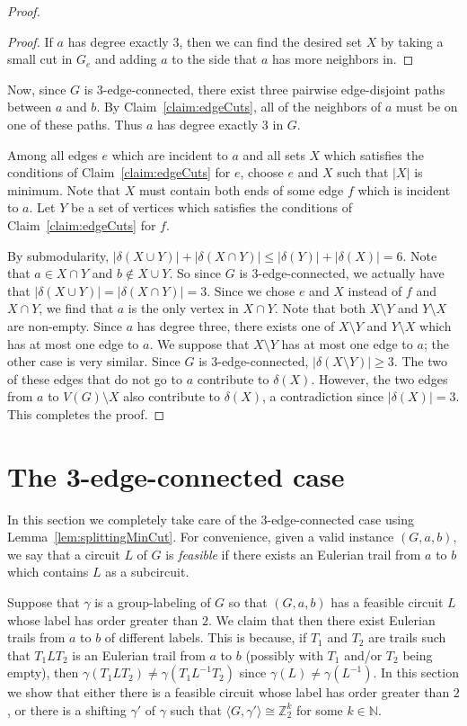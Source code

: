 \documentclass[a4paper, 12pt]{article}
\let\leq\leqslant
\let\geq\geqslant
\begin{document}
\begin{proof}
\begin{proof}
If $a$ has degree exactly $3$, then we can find the desired set $X$ by taking a small cut in $G_e$ and adding $a$ to the side that $a$ has more neighbors in. 
\end{proof}

Now, since $G$ is $3$-edge-connected, there exist three pairwise edge-disjoint paths between $a$ and $b$. By Claim~\ref{claim:edgeCuts}, all of the neighbors of $a$ must be on one of these paths. Thus $a$ has degree exactly $3$ in $G$.

Among all edges $e$ which are incident to $a$ and all sets $X$ which satisfies the conditions of Claim~\ref{claim:edgeCuts} for $e$, choose $e$ and $X$ such that $|X|$ is minimum. Note that $X$ must contain both ends of some edge $f$ which is incident to $a$. Let $Y$ be a set of vertices which satisfies the conditions of Claim~\ref{claim:edgeCuts} for $f$.

By submodularity, $|\delta(X \cup Y)|+|\delta(X \cap Y)| \leq |\delta(Y)|+|\delta(X)|=6$. Note that $a \in X\cap Y$ and $b \notin X \cup Y$. So since $G$ is $3$-edge-connected, we actually have that $|\delta(X \cup Y)|=|\delta(X \cap Y)| = 3$. Since we chose $e$ and $X$ instead of $f$ and $X \cap Y$, we find that $a$ is the only vertex in $X \cap Y$. Note that both $X\setminus Y$ and $Y\setminus X$ are non-empty. Since $a$ has degree three, there exists one of $X\setminus Y$ and $Y\setminus X$ which has at most one edge to $a$. We suppose that $X\setminus Y$ has at most one edge to $a$; the other case is very similar. Since $G$ is $3$-edge-connected, $|\delta(X\setminus Y)|\geq 3$. The two of these edges that do not go to $a$ contribute to $\delta(X)$. However, the two edges from $a$ to $V(G)\setminus X$ also contribute to $\delta(X)$, a contradiction since $|\delta(X)|=3$. This completes the proof.
\end{proof}


\section{The 3-edge-connected case}
\label{sec:3ConnFinal}

In this section we completely take care of the $3$-edge-connected case using Lemma~\ref{lem:splittingMinCut}. For convenience, given a valid instance $(G, a,b)$, we say that a circuit $L$ of $G$ is \emph{feasible} if there exists an Eulerian trail from $a$ to $b$ which contains $L$ as a subcircuit. 

Suppose that $\gamma$ is a group-labeling of $G$ so that $(G,a,b)$ has a feasible circuit $L$ whose label has order greater than $2$. We claim that then there exist Eulerian trails from $a$ to $b$ of different labels. This is because, if $T_1$ and $T_2$ are trails such that $T_1 L T_2$ is an Eulerian trail from $a$ to $b$ (possibly with $T_1$ and/or $T_2$ being empty), then $\gamma(T_1 L T_2)\neq \gamma(T_1 L^{-1} T_2)$ since $\gamma(L)\neq \gamma(L^{-1})$. In this section we show that either there is a feasible circuit whose label has order greater than $2$, or there is a shifting $\gamma'$ of $\gamma$ such that $\langle G, \gamma'\rangle \cong \mathbb{Z}_2^k$ for some $k\in \mathbb{N}$. 
\end{document}
